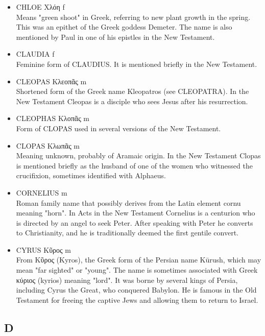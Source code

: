\begin{itemize}
\item {CHLOE Χλόη f}\\
Means "green shoot" in Greek, referring to new plant growth in the spring. This was an epithet of the Greek goddess Demeter. The name is also mentioned by Paul in one of his epistles in the New Testament. 

\item {CLAUDIA f}\\
Feminine form of CLAUDIUS. It is mentioned briefly in the New Testament. 

\item {CLEOPAS Κλεοπᾶς m}\\
Shortened form of the Greek name Kleopatros (see CLEOPATRA). In the New Testament Cleopas is a disciple who sees Jesus after his resurrection.

\item {CLEOPHAS Κλοπᾶς m}\\
Form of CLOPAS used in several versions of the New Testament.

\item {CLOPAS Κλωπᾶς m}\\
Meaning unknown, probably of Aramaic origin. In the New Testament Clopas is mentioned briefly as the husband of one of the women who witnessed the crucifixion, sometimes identified with Alphaeus.

\item {CORNELIUS m}\\
Roman family name that possibly derives from the Latin element cornu meaning "horn". In Acts in the New Testament Cornelius is a centurion who is directed by an angel to seek Peter. After speaking with Peter he converts to Christianity, and he is traditionally deemed the first gentile convert. 

\item {CYRUS Κῦρος m}\\
From Κῦρος (Kyros), the Greek form of the Persian name Kūrush, which may mean "far sighted" or "young". The name is sometimes associated with Greek κύριος (kyrios) meaning "lord". It was borne by several kings of Persia, including Cyrus the Great, who conquered Babylon. He is famous in the Old Testament for freeing the captive Jews and allowing them to return to Israel. 
\end{itemize}
 
\subsection{D}

